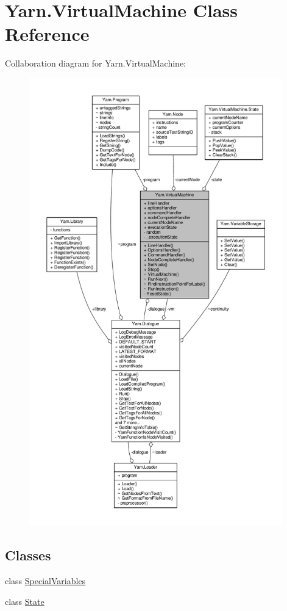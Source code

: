 \hypertarget{a00147}{\section{Yarn.\-Virtual\-Machine Class Reference}
\label{a00147}
}


Collaboration diagram for Yarn.\-Virtual\-Machine\-:
\nopagebreak
\begin{figure}[H]
\begin{center}
\leavevmode
\includegraphics[height=550pt]{a00637}
\end{center}
\end{figure}
\subsection*{Classes}
\begin{DoxyCompactItemize}
\item 
class \hyperlink{a00147_a00356}{Special\-Variables}
\item 
class \hyperlink{a00150}{State}
\end{DoxyCompactItemize}
